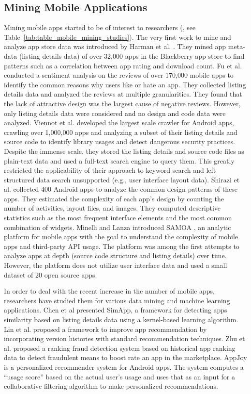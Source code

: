 \subsection{Mining Mobile Applications}
Mining mobile apps started to be of interest to researchers (\cite{}, see Table~\ref{tab:table_mobile_mining_studies}).
The very first work to mine and analyze app store data was introduced by Harman et al. \cite{Harman_2012_MSR}.
They mined app meta-data (listing details data) of over 32,000 apps in the Blackberry app store to find patterns such as a correlation between app rating and download count.
Fu et al. \cite{fu_2013_KDD} conducted a sentiment analysis on the reviews of over 170,000 mobile apps to identify the common reasons why users like or hate an app. 
They collected listing details data and analyzed the reviews at multiple granularities.
They found that the lack of attractive design was the largest cause of negative reviews. 
However, only listing details data were considered and no design and code data were analyzed.
Viennot et al. \cite{viennot_2014_metrics} developed the largest scale crawler for Android apps, crawling over 1,000,000 apps and analyzing a subset of their listing details and source code to identify library usages and detect dangerous security practices.
Despite the immense scale, they stored the listing details and source code files as plain-text data and used a full-text search engine to query them.
This greatly restricted the applicability of their approach to keyword search and left structured data search unsupported (e.g., user interface layout data).
Shirazi et al. \cite{shirazi_EICS_2013} collected 400 Android apps to analyze the common design patterns of these apps.
They estimated the complexity of each app's design by counting the number of activities, layout files, and images.
They computed descriptive statistics such as the most frequent interface elements and the most common combination of widgets.
Minelli and Lanza introduced SAMOA \cite{Minelli_2013_CMSREuro}, an analytic platform for mobile apps with the goal to understand the complexity of mobile apps and third-party API usage.
The platform was among the first attempts to analyze apps at depth (source code structure and listing details) over time.
However, the platform does not utilize user interface data and used a small dataset of 20 open source apps.

In order to deal with the recent increase in the number of mobile apps, researchers have studied them for various data mining and machine learning applications.
Chen et al \cite{Chen_2015_WSDM} presented SimApp, a framework for detecting apps similarity based on listing details data using a kernel-based learning algorithm.
Lin et al. \cite{lin_2014_SIGIR} proposed a framework to improve app  recommendation by incorporating version histories with standard recommendation techniques.
Zhu et al. \cite{zhu_2013_CIKM} proposed a ranking fraud detection system based on historical app ranking data to detect fraudulent means to boost rate an app in the marketplace.
AppJoy \cite{yan_2011_MobiSys} is a personalized recommender system for Android apps.
The system computes a ``usage score'' based on the actual user's usage and uses that as an input for a collaborative filtering algorithm to make personalized recommendations.

